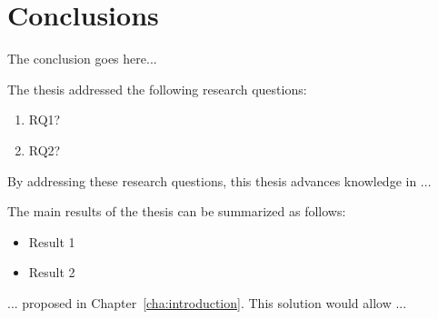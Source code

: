 \chapter{Conclusions}
\label{cha:conclusions}
\vspace{0.4 cm}

The conclusion goes here...

The thesis addressed the following research questions:
\begin{enumerate}
  \item RQ1?
  \item RQ2?
\end{enumerate}
By addressing these research questions, this thesis advances knowledge in ...

The main results of the thesis can be summarized as follows:
\begin{itemize}
  \item Result 1
  \item Result 2
\end{itemize}

... proposed in Chapter~\ref{cha:introduction}. This solution would allow ...